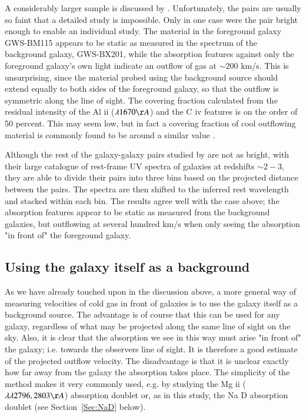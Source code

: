 \documentclass[a4wide,12pt]{book}
\begin{document}
{A considerably larger sample is discussed by \citet{steidel-2010}.  Unfortunately, the pairs are usually so faint that a detailed study is impossible. Only in one case were the pair bright enough to enable an individual study. The material in the foreground galaxy GWS-BM115 appears to be static as measured in the spectrum of the background galaxy, GWS-BX201, while the absorption features against only the foreground galaxy's own light indicate an outflow of gas at $\sim 200$ km/s.  This is unsurprising, since the material probed using the background source should extend equally to both sides of the foreground galaxy, so that the outflow is symmetric along the line of sight. The covering fraction calculated from the residual intensity of the Al {\sc ii} ($\lambda 1670 \AA$) and the C {\sc iv} features 
is on the order of 50 percent. This may seem low, but in fact a covering fraction of cool outflowing material is commonly found to be around a similar value \citep[see e.g.][]{shapley-2003}.

Although the rest of the galaxy-galaxy pairs studied by \citet{steidel-2010} are not as bright, with their large catalogue of rest-frame UV spectra of galaxies at redshifts $\sim 2-3$, they are able to divide their pairs into three bins based on the projected distance between the pairs. The spectra are then shifted to the inferred rest wavelength and stacked within each bin. The results agree well with the case above; the absorption features appear to be static as measured from the background galaxies, but outflowing at several hundred km/s when only seeing the absorption "in front of" the foreground galaxy. 

\subsection{Using the galaxy itself as a background}

As we have already touched upon in the discussion above, a more general way of measuring velocities of cold gas in front of galaxies is to use the galaxy itself as a background source. The advantage is of course that this can be used for any galaxy, regardless of what may be projected along the same line of sight on the sky. Also, it is clear that the absorption we see in this way must arise "in front of" the galaxy; i.e. towards the observers line of sight. It is therefore a good estimate of the projected outflow velocity. The disadvantage is that it is unclear exactly how far away from the galaxy the absorption takes place. The simplicity of the method makes it very commonly used, e.g. by studying the Mg {\sc ii} ($\lambda \lambda 2796,2803 \AA$) absorption doublet or, as in this study, the Na D absorption doublet (see Section~\ref{Sec:NaD} below).

}
\end{document}
